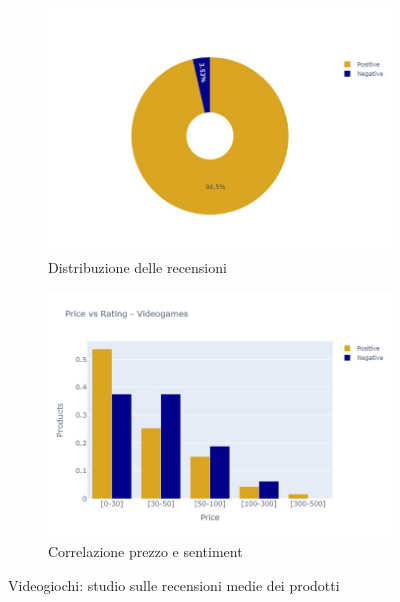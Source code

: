			\begin{figure} [h]
				\centering
				\begin{subfigure}{0.48\textwidth}
					\includegraphics[width=\textwidth]{Figure/pie_videogames}
					\caption{Distribuzione delle recensioni}
					\label{fig:pie_videogames}
				\end{subfigure}
				\begin{subfigure}{0.48\textwidth}
					\includegraphics[width=\textwidth]{Figure/priceVSrating_videogames}
					\caption{Correlazione prezzo e sentiment}
					\label{fig:priceVSrating_videogames}
				\end{subfigure}
				\caption{Videogiochi: studio sulle recensioni medie dei prodotti}\label{fig:price_raiting_videogames}
			\end{figure}
	
